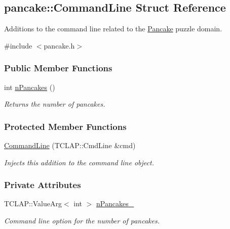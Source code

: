\hypertarget{structpancake_1_1CommandLine}{}\subsection{pancake\+:\+:Command\+Line Struct Reference}
\label{structpancake_1_1CommandLine}


Additions to the command line related to the \hyperlink{structpancake_1_1Pancake}{Pancake} puzzle domain.  




{\ttfamily \#include $<$pancake.\+h$>$}

\subsubsection*{Public Member Functions}
\begin{DoxyCompactItemize}
\item 
int \hyperlink{structpancake_1_1CommandLine_ac81741f358ad04770d5334132e598e29}{n\+Pancakes} ()
\begin{DoxyCompactList}\small\item\em Returns the number of pancakes. \end{DoxyCompactList}\end{DoxyCompactItemize}
\subsubsection*{Protected Member Functions}
\begin{DoxyCompactItemize}
\item 
\hyperlink{structpancake_1_1CommandLine_a506488e83bb700b938b516a64014f0a3}{Command\+Line} (T\+C\+L\+A\+P\+::\+Cmd\+Line \&cmd)
\begin{DoxyCompactList}\small\item\em Injects this addition to the command line object. \end{DoxyCompactList}\end{DoxyCompactItemize}
\subsubsection*{Private Attributes}
\begin{DoxyCompactItemize}
\item 
T\+C\+L\+A\+P\+::\+Value\+Arg$<$ int $>$ \hyperlink{structpancake_1_1CommandLine_addc3b1354ba98c9eaa93a7c44439d6fd}{n\+Pancakes\+\_\+}\hypertarget{structpancake_1_1CommandLine_addc3b1354ba98c9eaa93a7c44439d6fd}{}\label{structpancake_1_1CommandLine_addc3b1354ba98c9eaa93a7c44439d6fd}

\begin{DoxyCompactList}\small\item\em Command line option for the number of pancakes. \end{DoxyCompactList}\end{DoxyCompactItemize}


